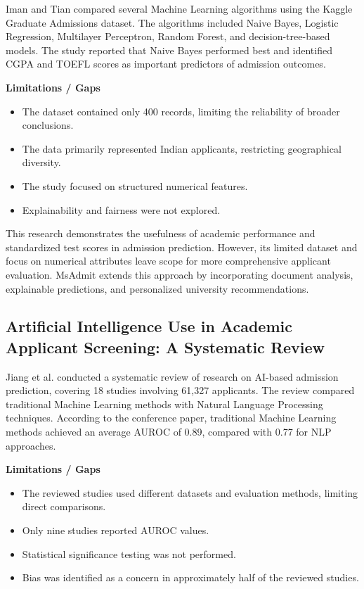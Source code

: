 Iman and Tian \cite{iman2021} compared several Machine Learning
algorithms using the Kaggle Graduate Admissions dataset. The
algorithms included Naive Bayes, Logistic Regression, Multilayer
Perceptron, Random Forest, and decision-tree-based models. The study
reported that Naive Bayes performed best and identified CGPA and
TOEFL scores as important predictors of admission outcomes.

\noindent\textbf{Limitations / Gaps}
\begin{itemize}
    \item The dataset contained only 400 records, limiting the reliability
    of broader conclusions.
    \item The data primarily represented Indian applicants, restricting
    geographical diversity.
    \item The study focused on structured numerical features.
    \item Explainability and fairness were not explored.
\end{itemize}

This research demonstrates the usefulness of academic performance
and standardized test scores in admission prediction. However, its
limited dataset and focus on numerical attributes leave scope for
more comprehensive applicant evaluation. MsAdmit extends this
approach by incorporating document analysis, explainable predictions,
and personalized university recommendations.

\subsection{Artificial Intelligence Use in Academic Applicant Screening: A Systematic Review}

Jiang et al. \cite{jiang2025} conducted a systematic review of research
on AI-based admission prediction, covering 18 studies involving
61,327 applicants. The review compared traditional Machine Learning
methods with Natural Language Processing techniques. According to
the conference paper, traditional Machine Learning methods achieved
an average AUROC of 0.89, compared with 0.77 for NLP approaches.

\noindent\textbf{Limitations / Gaps}
\begin{itemize}
    \item The reviewed studies used different datasets and evaluation
    methods, limiting direct comparisons.
    \item Only nine studies reported AUROC values.
    \item Statistical significance testing was not performed.
    \item Bias was identified as a concern in approximately half of the
    reviewed studies.
\end{itemize}

